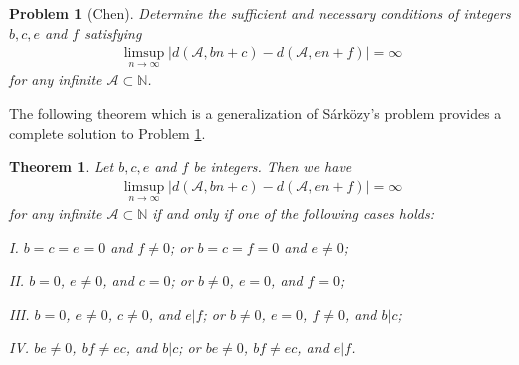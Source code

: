 \documentclass[12pt,a4paper,reqno]{amsart}
\numberwithin{equation}{section}
\theoremstyle{plain}
\newtheorem{theorem}{Theorem}
\newtheorem{problem}{Problem}
\theoremstyle{definition}
\begin{document}
\begin{problem}[Chen]\label{pro2}
Determine the sufficient and necessary conditions of integers $b,c,e$ and $f$ satisfying 
\begin{align*}
\limsup_{n\rightarrow\infty}|d(\mathcal{A},bn+c)-d(\mathcal{A},en+f)|=\infty
\end{align*}
for any infinite $\mathcal{A}\subset \mathbb{N}$.
\end{problem}

The following theorem which is a generalization of S\'ark\"ozy's problem provides a complete solution to Problem \ref{pro2}.

\begin{theorem}\label{thm2}
Let $b,c,e$ and $f$ be integers. Then we have
\begin{align}\label{eq4}
\limsup_{n\rightarrow\infty}|d(\mathcal{A},bn+c)-d(\mathcal{A},en+f)|=\infty
\end{align}
for any infinite $\mathcal{A}\subset \mathbb{N}$ 
if and only if one of the following cases holds:

I. $b=c=e=0$ and $f\neq 0$; or $b=c=f=0$ and $e\neq 0$;

II. $b=0$, $e\neq 0$, and $c=0$; or $b\neq 0$, $e= 0$, and $f=0$;

III. $b=0$, $e\neq 0$, $c\neq 0$, and $e|f$; or $b\neq 0$, $e= 0$, $f\neq 0$, and $b|c$;

IV. $be \neq 0$, $bf\neq ec$, and $b|c$; or $be \neq 0$, $bf\neq ec$, and $e|f$.
\end{theorem}
\end{document}
